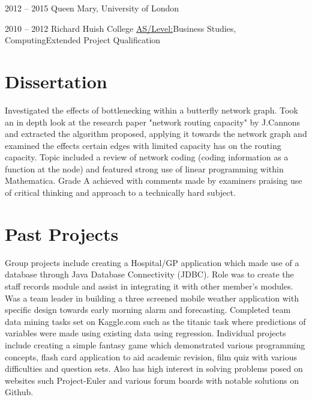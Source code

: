 \documentclass{tccv}
\begin{document}
\begin{yearlist}

\item[2:1 BSc Computer\newline Science(Hons)]{2012 -- 2015}
     {Queen Mary, University of London}

\item[\underline{A/Level:}\newline Economics, Psychology\newline Mathematics]{2010 -- 2012}
     {Richard Huish College}
     {\underline{AS/Level:}\newline Business Studies, Computing\newline Extended Project Qualification}

\end{yearlist}

\section{Dissertation}

Investigated the effects of bottlenecking within a butterfly network graph. Took an in depth look at
the research paper "network routing capacity" by J.Cannons and extracted the algorithm proposed,
applying it towards the network graph and examined the effects certain edges with limited capacity
has on the routing capacity. Topic included a review of network coding (coding information as a
function at the node) and featured strong use of linear programming within Mathematica. Grade
A achieved with comments made by examiners praising use of critical thinking and approach to a
technically hard subject.

\section{Past Projects}

Group projects include creating a Hospital/GP application which made use of a database through
Java Database Connectivity (JDBC). Role was to create the  staff records  module and assist in
integrating it with other member's modules. Was a team leader in building a three screened mobile
weather application with specific design towards early morning alarm and forecasting. Completed
team data mining tasks set on Kaggle.com such as the titanic task where predictions of variables
were made using existing data using regression.
\newline \newline
Individual projects include creating a simple fantasy game which demonstrated various programming concepts, flash card application to aid academic revision, film quiz with various difficulties and question sets. Also has high interest in solving problems posed on websites such Project-Euler and various forum boards with notable solutions on Github.
\end{document}
